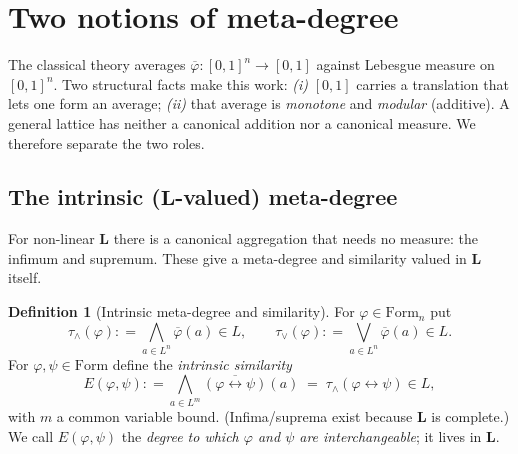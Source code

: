 \documentclass{amsart}
\theoremstyle{definition}
\newtheorem{definition}{Definition}
\theoremstyle{plain}
\newcommand{\eqdef}{\mathrel{\mathop:}=}
\newcommand{\bL}{\mathbf{L}}
\newcommand{\Form}{\mathrm{Form}}
\newcommand{\fbi}{\leftrightarrow}
\begin{document}
\section{Two notions of meta-degree}\label{sec:meta}

The classical theory averages $\overline\varphi:[0,1]^n\to[0,1]$ against Lebesgue
measure on $[0,1]^n$.  Two structural facts make this work: \emph{(i)} $[0,1]$
carries a translation that lets one form an average; \emph{(ii)} that average is
\emph{monotone} and \emph{modular} (additive).  A general lattice has neither a
canonical addition nor a canonical measure.  We therefore separate the two roles.

\subsection{The intrinsic ($\bL$-valued) meta-degree}

For non-linear $\bL$ there is a canonical aggregation that needs no measure: the
infimum and supremum.  These give a meta-degree and similarity valued in $\bL$
itself.

\begin{definition}[Intrinsic meta-degree and similarity]\label{def:intrinsic}
For $\varphi\in\Form_n$ put
\begin{equation}\label{eq:intr}
\tau_\wedge(\varphi)\eqdef\bigwedge_{a\in L^n}\overline\varphi(a)\in L,
\qquad
\tau_\vee(\varphi)\eqdef\bigvee_{a\in L^n}\overline\varphi(a)\in L .
\end{equation}
For $\varphi,\psi\in\Form$ define the \emph{intrinsic similarity}
\begin{equation}\label{eq:Esim}
E(\varphi,\psi)\eqdef
\bigwedge_{a\in L^{m}}\overline{(\varphi\fbi\psi)}(a)\;=\;\tau_\wedge(\varphi\fbi\psi)\in L,
\end{equation}
with $m$ a common variable bound.  (Infima/suprema exist because $\bL$ is
complete.)  We call $E(\varphi,\psi)$ the \emph{degree to which $\varphi$ and
$\psi$ are interchangeable}; it lives in $\bL$.
\end{definition}
\end{document}
